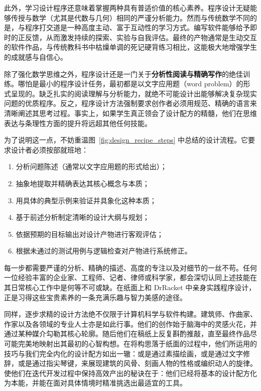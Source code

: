 此外，学习设计程序还意味着掌握两种具有普适价值的核心素养。程序设计无疑能够传授与数学（尤其是代数与几何）相同的严谨分析能力。然而与传统数学不同的是，与程序打交道是一种高度主动、富于互动性的学习方式。编写软件能够给予即时的正反馈，从而激发持续的探索、实验与自我评估。最终的产物通常是生动交互的软件作品，与传统教科书中枯燥单调的死记硬背练习相比，这能极大地增强学生的成就感与自信心。

除了强化数学思维之外，程序设计还是一门关于\textbf{分析性阅读与精确写作}的绝佳训练。哪怕是最小的程序设计任务，最初都是以文字应用题（word problem）的形式呈现的。缺乏扎实的阅读理解与分析能力，就绝不可能设计出能够解决复杂现实问题的优质程序。反之，程序设计方法强制要求创作者必须用规范、精确的语言来清晰阐述其思考过程。事实上，如果学生真正领会了设计配方的精髓，他们在思维表达与条理性方面的提升将远超其他任何技能。

为了说明这一点，不妨重温图~\ref{fig:design_recipe_steps} 中总结的设计流程。它要求设计者必须按部就班地：
\begin{enumerate}
  \item 分析问题陈述（通常以文字应用题的形式给出）；
  \item 抽象地提取并精确表达其核心概念与本质；
  \item 用具体的典型示例来验证并具象化这种本质；
  \item 基于前述分析制定清晰的设计大纲与规划；
  \item 依据预期的目标输出对设计产物进行客观评估；
  \item 根据未通过的测试用例与逻辑检查对产物进行系统修正。
\end{enumerate}

每一步都需要严谨的分析、精确的描述、高度的专注以及对细节的一丝不苟。任何一位经验丰富的企业家、工程师、记者、律师或科学家，都会深切认同上述技能在其日常核心工作中是何等不可或缺。在纸面上和 DrRacket 中亲身实践程序设计，正是习得这些宝贵素养的一条充满乐趣与智力美感的途径。

同样，逐步求精的设计方法绝不仅限于计算机科学与软件构建。建筑师、作曲家、作家以及各领域的专业人士亦是如此行事。他们的创作始于脑海中的灵感火花，并通过某种媒介勾勒其核心轮廓。随后他们在稿纸上反复斟酌推敲，直至最终作品尽可能完美地映射出其最初的心智构想。在将构思落于纸面的过程中，他们所运用的技巧与我们完全内化的设计配方如出一辙：或是通过素描绘画，或是通过文字修辞，或是通过指尖琴键，来展现建筑的风骨、刻画人物的性格或编织动人的旋律。使他们在迭代开发过程中保持高效产出的秘诀在于：他们已经将基本的设计配方化为本能，并能在面对具体情境时精准挑选出最适宜的工具。


